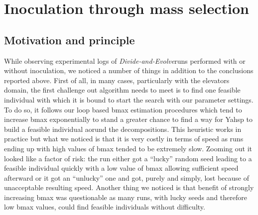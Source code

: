 \documentclass[english]{DESCARWINreport}
\newcommand{\dae}{{\em Divide-and-Evolve}}
\begin{document}
\newpage









\chapter{Inoculation through mass selection}

\section{Motivation and principle}

While observing experimental logs of \dae runs performed with or without inoculation, we noticed a number of things in addition to the conclusions reported above. First of all, in many cases, particularly with the elevators domain, the first challenge out algorithm needs to meet is to find one feasible individual with which it is bound to start the search with our parameter settings. To do so, it follows our loop based bmax estimation procedures which tend to increase bmax exponentially to stand a greater chance to find a way for Yahsp to build a feasible individual aorund the decompositions. This heuristic works in practice but what we noticed is that it is very costly in terms of speed as runs ending up with high values of bmax tended to be extremely slow. Zooming out it looked like a factor of risk: the run either got a ``lucky'' random seed leading to a feasible individual quickly with a low value of bmax allowing sufficient speed afterward or it got an ``unlucky'' one and got, purely and simply, lost because of unacceptable resulting speed. Another thing we noticed is that benefit of strongly increasing bmax was questionable as many runs, with lucky seeds and therefore low bmax values, could find feasible individuals without difficulty.
\end{document}
